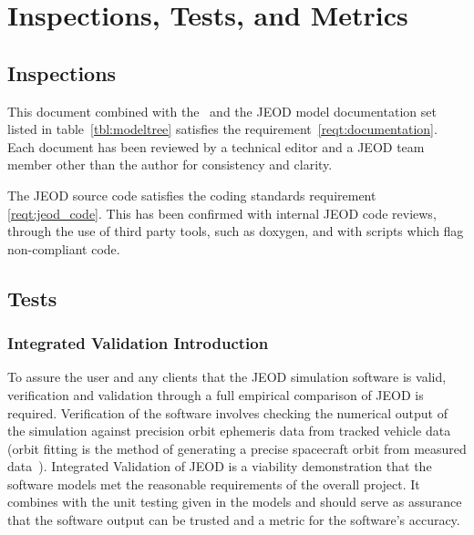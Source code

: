 %
%
%
%
%

\chapter{Inspections, Tests, and Metrics}\label{ch:ivv}

\section{Inspections}
\label{inspect:documentation}
This document combined with the \hyperTutorial\ and the JEOD model documentation
set listed in table~\ref{tbl:modeltree} satisfies the requirement~\ref{reqt:documentation}.
Each document has been reviewed by a technical editor and a JEOD team member
other than the author for consistency and clarity.

\label{inspect:code}
The JEOD source code satisfies the coding standards requirement \ref{reqt:jeod_code}.
This has been confirmed with internal JEOD code reviews, through the use of third
party tools, such as doxygen, and with scripts which flag non-compliant code.

\section{Tests}
\subsection{Integrated  Validation Introduction}
To assure the user and any clients that the JEOD simulation software is valid,
verification and validation through a full empirical comparison of JEOD is required.
Verification of the software involves checking the numerical output of the simulation
against precision orbit ephemeris data from tracked vehicle data (orbit fitting is
the method of generating a precise spacecraft orbit from measured data~\cite{VMcC}).
Integrated Validation of JEOD is a viability demonstration that the software models
met the reasonable requirements of the overall project. It combines with the unit
testing given in the models and should serve as assurance that the software output
can be trusted and a metric for the software's accuracy.

